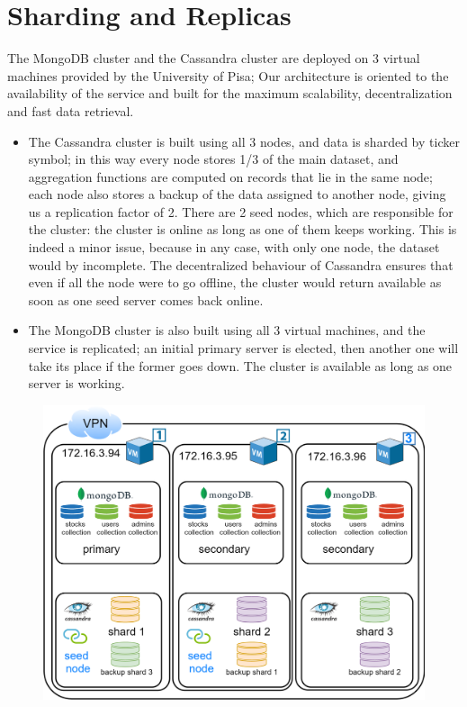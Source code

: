 \section{Sharding and Replicas}
The MongoDB cluster and the Cassandra cluster are deployed on 3 virtual machines
provided by the University of Pisa; Our architecture is oriented to the
availability of the service and built for the maximum scalability,
decentralization and fast data retrieval.
\begin{itemize}
    \item The Cassandra cluster is built using all 3 nodes, and data is sharded
    by ticker symbol; in this way every node stores 1/3 of the main dataset,
    and aggregation functions are computed on records that lie in the same node;
    each node also stores a backup of the data assigned to another node, giving
    us a replication factor of 2. There are 2 seed nodes, which are responsible
    for the cluster: the cluster is online as long as one of them keeps working.
    This is indeed a minor issue, because in any case, with only one node, the
    dataset would by incomplete. The decentralized behaviour of Cassandra
    ensures that even if all the node were to go offline, the cluster would
    return available as soon as one seed server comes back online. 
    \item The MongoDB cluster is also built using all 3 virtual machines, and
    the service is replicated; an initial primary server is elected, then
    another one will take its place if the former goes down. The cluster is
    available as long as one server is working.
\end{itemize}
\begin{figure}[H]
	\begin{center}
		\includegraphics[scale=0.2]{img/cluster_diagram.png}
	\end{center}
\end{figure}
